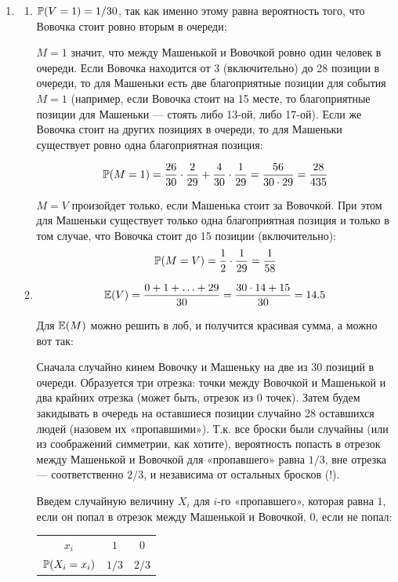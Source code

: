 \begin{enumerate}
\item
\begin{enumerate}
\item $\P(V = 1) = 1/30$, так как именно этому равна вероятность того, что
Вовочка стоит ровно вторым в очереди;

$M = 1$ значит, что между Машенькой и Вовочкой ровно один человек в очереди.
Если Вовочка находится от 3 (включительно) до 28 позиции в очереди, то для
Машеньки есть две благоприятные позиции для события $M = 1$ (например, если
Вовочка стоит на 15 месте, то благоприятные позиции для Машеньки — стоять либо
13-ой, либо 17-ой). Если же Вовочка стоит на других позициях в очереди, то для
Машеньки существует ровно одна благоприятная позиция:

\[
\P(M = 1) = \frac{26}{30} \cdot \frac{2}{29} +  \frac{4}{30} \cdot \frac{1}{29} = \frac{56}{30\cdot 29} = \frac{28}{435}
\]

$M = V$ произойдет только, если Машенька стоит за Вовочкой. При этом для Машеньки
существует только одна благоприятная позиция и только в том случае, что Вовочка стоит
до 15 позиции (включительно):
\[
\P(M = V) = \frac{1}{2} \cdot \frac{1}{29} = \frac{1}{58}
\]

\item
\[
\E(V) = \frac{0 + 1 + \ldots + 29}{30} = \frac{30\cdot 14 + 15}{30} = 14.5
\]

Для $\E(M)$ можно решить в лоб, и получится красивая сумма, а можно вот так:

Сначала случайно кинем Вовочку и Машеньку на две из 30 позиций в очереди.
Образуется три отрезка: точки между Вовочкой и Машенькой и два крайних отрезка
(может быть, отрезок из 0 точек). Затем будем закидывать в очередь на оставшиеся
позиции случайно 28 оставшихся людей (назовем их «пропавшими»). Т.к. все броски
были случайны (или из соображений симметрии, как хотите), вероятность попасть в
отрезок между Машенькой и Вовочкой для «пропавшего» равна $1/3$, вне отрезка —
соответственно $2/3$, и независима от остальных бросков (!).

Введем случайную величину $X_i$ для $i$-го «пропавшего», которая равна $1$,
если он попал в отрезок между Машенькой и Вовочкой, $0$, если не попал:

\begin{center}
\begin{tabular}{ccc}
\toprule
$x_i$ & $1$ & $0$ \\
$\P(X_i = x_i)$ & $1/3$ & $2/3$ \\ \bottomrule
\end{tabular}
\end{center}


\end{enumerate}
\end{enumerate}
